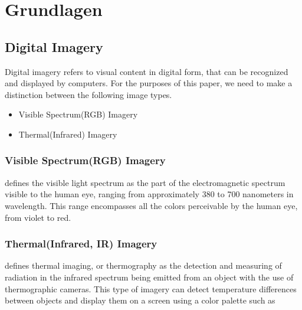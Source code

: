\chapter{Grundlagen}

\section{Digital Imagery}
Digital imagery refers to visual content in digital form, that can be recognized and displayed by computers. For the purposes of this paper, we need to make a distinction between the following image types.

\begin{itemize}
	\item{Visible Spectrum(RGB) Imagery}
	\item{Thermal(Infrared) Imagery}
\end{itemize}

\subsection{Visible Spectrum(RGB) Imagery}

\cite{nasa_visiblelight} defines the visible light spectrum as the part of the electromagnetic spectrum visible to the human eye, ranging from approximately 380 to 700 nanometers in wavelength. This range encompasses all the colors perceivable by the human eye, from violet to red.

\subsection{Thermal(Infrared, IR) Imagery}
\cite{spi_thermal} defines thermal imaging, or thermography as the detection and measuring of radiation in the infrared spectrum being emitted from an object with the use of thermographic cameras. This type of imagery can detect temperature differences between objects and display them on a screen using a color palette such as 












